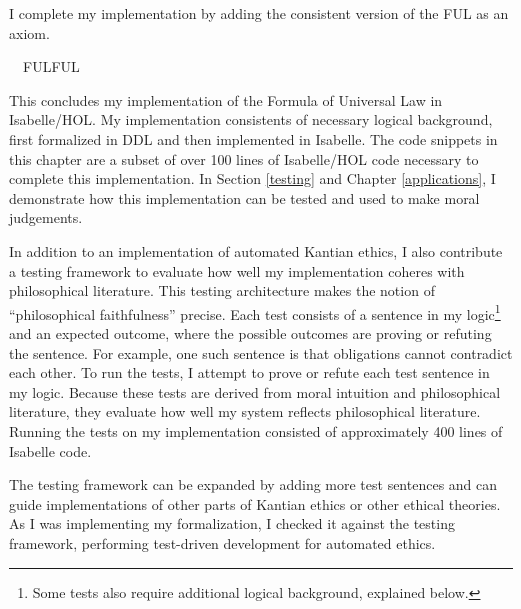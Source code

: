 \begin{isabellebody}
\begin{isamarkuptext}
I complete my implementation by adding the consistent version of the FUL as an axiom.%
\end{isamarkuptext}\isamarkuptrue%
\isamarkupfalse%
\ \ FUL{\isacharcolon}FUL%
\begin{isamarkuptext}%
This concludes my implementation of the Formula of Universal Law in Isabelle/HOL. My implementation
consistents of necessary logical background, first formalized in DDL and then implemented in Isabelle.
The code snippets in this chapter are a subset of over 100 lines of Isabelle/HOL code necessary to
complete this implementation. In Section \ref{testing} and Chapter \ref{applications}, I demonstrate how this
implementation can be tested and used to make moral judgements.%
\end{isamarkuptext}\isamarkuptrue%
%
\isadelimdocument
%
\endisadelimdocument
%
\isatagdocument
%
\isamarkuptrue%
%
\endisatagdocument
{\isafolddocument}%
%
\isadelimdocument
%
\endisadelimdocument
%
\begin{isamarkuptext}%
In addition to an implementation of automated Kantian ethics, I also contribute a testing framework 
to evaluate how well my implementation coheres with philosophical literature. This testing architecture 
makes the notion of ``philosophical faithfulness'' precise. Each test consists of a sentence in my logic\footnote{Some
tests also require additional logical background, explained below.} and an expected outcome, where 
the possible outcomes are proving or refuting the sentence. For example, 
one such sentence is that obligations cannot contradict each other. To run the tests, I attempt to
 prove or refute each test sentence in my logic.  Because these tests are derived from moral 
intuition and philosophical literature, they evaluate how well my system reflects philosophical
literature. Running the tests on my implementation consisted of approximately 400 lines of Isabelle code.

The testing framework can be expanded by adding more test sentences and can guide 
implementations of other parts of Kantian ethics or other ethical theories. As I was implementing my 
formalization, I checked it against the testing framework, performing test-driven development for automated 
ethics.


\end{isamarkuptext}
\end{isabellebody}
